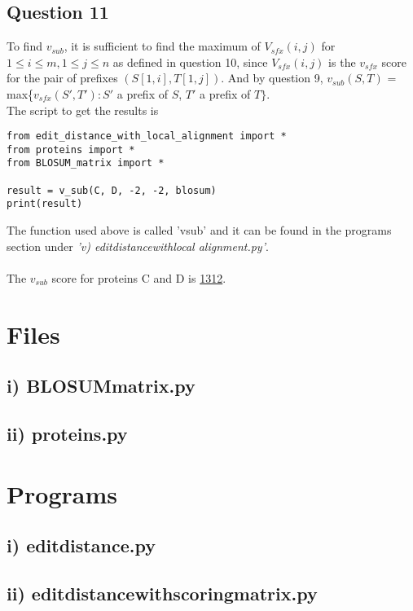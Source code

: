\documentclass[10pt]{article}
\begin{document}
\subsection*{Question 11}
To find $v_{sub}$, it is sufficient to find the maximum of $V_{sfx}(i,j)$ for $1\leq i \leq m, 1\leq j\leq n$ as defined in question 10, since $V_{sfx}(i,j)$ is the $v_{sfx}$ score for the pair of prefixes $(S[1,i],T[1,j])$. And by question 9, $v_{sub}(S,T)$ = max\{$v_{sfx}(S',T'):S'$ a prefix of $S$, $T'$ a prefix of $T\}$.\\
The script to get the results is
\begin{lstlisting}
from edit_distance_with_local_alignment import *
from proteins import *
from BLOSUM_matrix import *

result = v_sub(C, D, -2, -2, blosum)
print(result)
\end{lstlisting}
The function used above is called 'v\textunderscore sub' and it can be found in the programs section under \emph{'v) edit\textunderscore distance\textunderscore with\textunderscore local \textunderscore alignment.py'}.\\\\
The $v_{sub}$ score for proteins C and D is \underline{1312}.


\newpage
\section*{Files}
\subsection*{i) BLOSUM\textunderscore matrix.py}

\subsection*{ii) proteins.py}

\bigskip\bigskip\bigskip
\newpage
\section*{Programs}
\bigskip
\subsection*{i) edit\textunderscore distance.py}

\newpage
\subsection*{ii) edit\textunderscore distance\textunderscore with\textunderscore scoring\textunderscore matrix.py}

\newpage
\end{document}
